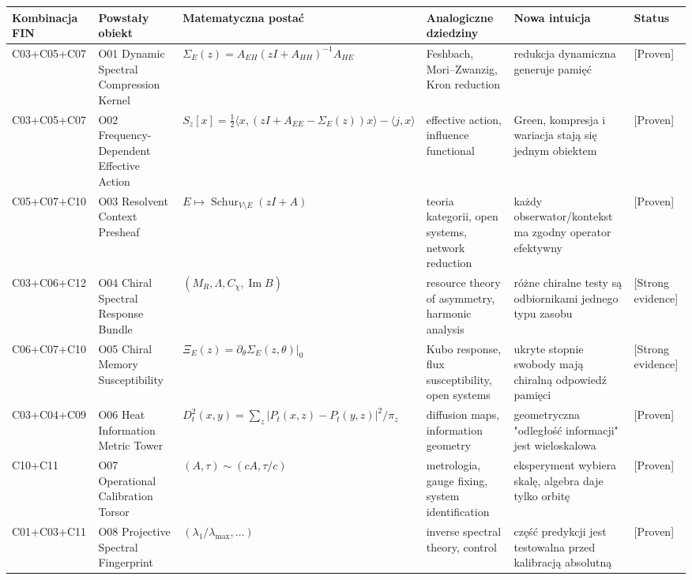 \documentclass[11pt,a4paper,openany]{report}
\newcommand{\statusProven}{\textcolor{fingreen}{[Proven]}}
\newcommand{\statusStrong}{\textcolor{finblue}{[Strong evidence]}}
\begin{document}
\begin{center}
\begingroup\fontsize{7}{8.4}\selectfont
\setlength{\tabcolsep}{2.5pt}
\renewcommand{\arraystretch}{1.16}
\begin{longtable}{@{}p{}p{}p{}p{}p{}p{}@{}}
\toprule
\textbf{Kombinacja FIN} & \textbf{Powstały obiekt} & \textbf{Matematyczna postać} & \textbf{Analogiczne dziedziny} & \textbf{Nowa intuicja} & \textbf{Status} \\
\midrule
\endhead
C03+\allowbreak{}C05+\allowbreak{}C07 & O01 Dynamic Spectral Compression Kernel & \(\Sigma_E(z)=A_{EH}(zI+A_{HH})^{-1}A_{HE}\) & Feshbach, Mori--Zwanzig, Kron reduction & redukcja dynamiczna generuje pamięć & \statusProven{} \\
C03+\allowbreak{}C05+\allowbreak{}C07 & O02 Frequency-Dependent Effective Action & \(S_z[x]=\frac12\langle x,(zI+A_{EE}-\Sigma_E(z))x\rangle-\langle j,x\rangle\) & effective action, influence functional & Green, kompresja i wariacja stają się jednym obiektem & \statusProven{} \\
C05+\allowbreak{}C07+\allowbreak{}C10 & O03 Resolvent Context Presheaf & \(E\mapsto\operatorname{Schur}_{V\setminus E}(zI+A)\) & teoria kategorii, open systems, network reduction & ka\.zdy obserwator/\allowbreak{}kontekst ma zgodny operator efektywny & \statusProven{} \\
C03+\allowbreak{}C06+\allowbreak{}C12 & O04 Chiral Spectral Response Bundle & \((M_R,\Lambda,C_\chi,\operatorname{Im}B)\) & resource theory of asymmetry, harmonic analysis & ró\.zne chiralne testy są odbiornikami jednego typu zasobu & \statusStrong{} \\
C06+\allowbreak{}C07+\allowbreak{}C10 & O05 Chiral Memory Susceptibility & \(\Xi_E(z)=\partial_\theta\Sigma_E(z,\theta)|_0\) & Kubo response, flux susceptibility, open systems & ukryte stopnie swobody mają chiralną odpowiedź pamięci & \statusStrong{} \\
C03+\allowbreak{}C04+\allowbreak{}C09 & O06 Heat Information Metric Tower & \(D_t^2(x,y)=\sum_z|P_t(x,z)-P_t(y,z)|^2/\pi_z\) & diffusion maps, information geometry & geometryczna "odległość informacji" jest wieloskalowa & \statusProven{} \\
C10+\allowbreak{}C11 & O07 Operational Calibration Torsor & \((A,\tau)\sim(cA,\tau/c)\) & metrologia, gauge fixing, system identification & eksperyment wybiera skalę, algebra daje tylko orbitę & \statusProven{} \\
C01+\allowbreak{}C03+\allowbreak{}C11 & O08 Projective Spectral Fingerprint & \((\lambda_1/\lambda_{\max},\ldots)\) & inverse spectral theory, control & część predykcji jest testowalna przed kalibracją absolutną & \statusProven{} \\

\end{longtable}
\end{center}
\end{document}
